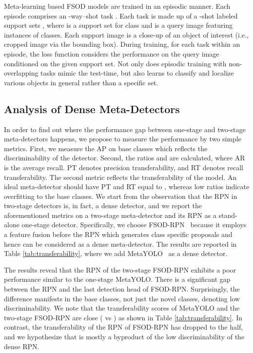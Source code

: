 \documentclass[10pt,twocolumn,letterpaper]{article}
\begin{document}
Meta-learning based FSOD models are trained in an episodic manner. Each episode  comprises an -way--shot task . Each task is made up of a  -shot labeled support sets , where  is a support set for class  and  is a query image featuring instances of  classes. Each support image  is a close-up of an object of interest (i.e., cropped image via the bounding box). During training, for each task within an episode, the loss function considers the performance on the query image conditioned on the given support set. Not only does episodic training with non-overlapping tasks mimic the test-time, but also learns to classify and localize various objects in general rather than a specific set. 

\subsection{Analysis of Dense Meta-Detectors}
In order to find out where the performance gap between one-stage and two-stage meta-detectors happens, we propose to measure the performance by two simple metrics. First, we measure the AP on base classes which reflects the discriminability of the detector. Second, the ratios  and  are calculated, where AR is the average recall. PT denotes precision transferability, and RT denotes recall transferability. The second metric reflects the transferability of the model. An ideal meta-detector should have PT and RT equal to , whereas low ratios indicate overfitting to the base classes. We start from the observation that the RPN in two-stage detectors is, in fact, a dense detector, and we report the aforementioned metrics on a two-stage meta-detector and its RPN as a stand-alone one-stage detector. Specifically, we choose FSOD-RPN~\cite{FSOD-RPN} because it employs a feature fusion before the RPN which generates class specific proposals and hence can be considered as a dense meta-detector. The results are reported in Table \ref{tab:transferability}, where we add MetaYOLO~\cite{FSRW} as a dense detector.  


The results reveal that the RPN of the two-stage FSOD-RPN exhibits a poor performance similar to the one-stage MetaYOLO. There is a significant gap between the RPN and the last detection head of FSOD-RPN. Surprisingly, the difference manifests in the base classes, not just the novel classes, denoting low discriminability. We note that the transferability scores of MetaYOLO and the two-stage FSOD-RPN are close ( vs ) as shown in Table \ref{tab:transferability}. In contrast, the transferability of the RPN of FSOD-RPN has dropped to the half, and we hypothesize that is mostly a byproduct of the low discriminability of the dense RPN.
\end{document}
